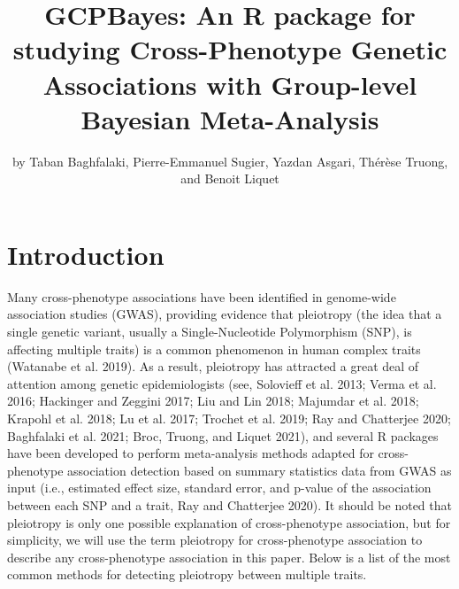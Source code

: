 \title{GCPBayes: An R package for studying Cross-Phenotype Genetic Associations with Group-level Bayesian Meta-Analysis}


\author{by Taban Baghfalaki, Pierre-Emmanuel Sugier, Yazdan Asgari, Thérèse Truong, and Benoit Liquet}

\maketitle


\hypertarget{introduction}{%
\section{Introduction}\label{introduction}}

Many cross-phenotype associations have been identified in genome-wide association studies (GWAS), providing evidence that pleiotropy (the idea that a single genetic variant, usually a Single-Nucleotide
Polymorphism (SNP), is affecting multiple traits) is a common phenomenon in human complex traits (Watanabe et al. 2019). As a result, pleiotropy has attracted a great deal of attention among genetic epidemiologists (see, Solovieff et al. 2013; Verma et al. 2016; Hackinger and Zeggini 2017; Liu and Lin 2018; Majumdar et al. 2018; Krapohl et al. 2018; Lu et al. 2017; Trochet et al. 2019; Ray and Chatterjee 2020; Baghfalaki et al. 2021; Broc, Truong, and Liquet 2021), and several R packages have been developed to perform meta-analysis methods adapted for cross-phenotype association detection based on summary statistics data from GWAS as input (i.e., estimated effect size, standard error, and p-value of the association between each SNP and a trait, Ray and Chatterjee 2020). It should be noted that pleiotropy is only one possible explanation of cross-phenotype association, but for simplicity, we will use the term pleiotropy for cross-phenotype association to describe any cross-phenotype association in this paper. Below is a list of the most common methods for detecting pleiotropy between multiple traits.


